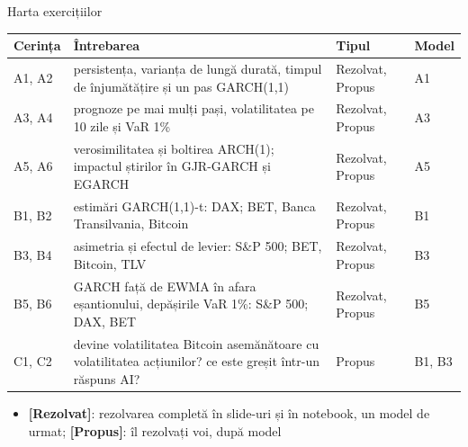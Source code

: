 \begin{frame}{Harta exercițiilor}
\itemsize{\small}
\begin{center}
\footnotesize
\begin{tabular}{>{\raggedright\arraybackslash}p{1.1cm}>{\raggedright\arraybackslash}p{7.5cm}>{\raggedright\arraybackslash}p{1.9cm}>{\raggedright\arraybackslash}p{1.4cm}}
\toprule
\textbf{Cerința} & \textbf{Întrebarea} & \textbf{Tipul} & \textbf{Model} \\
\midrule
A1, A2 & persistența, varianța de lungă durată, timpul de înjumătățire și un pas GARCH(1,1) & Rezolvat, Propus & A1 \\
A3, A4 & prognoze pe mai mulți pași, volatilitatea pe 10 zile și VaR 1\% & Rezolvat, Propus & A3 \\
A5, A6 & verosimilitatea și boltirea ARCH(1); impactul știrilor în GJR-GARCH și EGARCH & Rezolvat, Propus & A5 \\
B1, B2 & estimări GARCH(1,1)-t: DAX; BET, Banca Transilvania, Bitcoin & Rezolvat, Propus & B1 \\
B3, B4 & asimetria și efectul de levier: S\&P 500; BET, Bitcoin, TLV & Rezolvat, Propus & B3 \\
B5, B6 & GARCH față de EWMA în afara eșantionului, depășirile VaR 1\%: S\&P 500; DAX, BET & Rezolvat, Propus & B5 \\
C1, C2 & devine volatilitatea Bitcoin asemănătoare cu volatilitatea acțiunilor? ce este greșit într-un răspuns AI? & Propus & B1, B3 \\
\bottomrule
\end{tabular}
\end{center}
\begin{itemize}
    \item \textbf{[Rezolvat]}: rezolvarea completă în slide-uri și în notebook, un model de urmat; \textbf{[Propus]}: îl rezolvați voi, după model
\end{itemize}
\end{frame}

